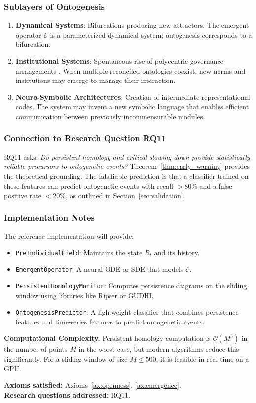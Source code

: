 \subsubsection{Sublayers of Ontogenesis}
\begin{enumerate}
    \item \textbf{Dynamical Systems}: Bifurcations producing new attractors. The emergent operator $\mathcal{E}$ is a parameterized dynamical system; ontogenesis corresponds to a bifurcation.
    \item \textbf{Institutional Systems}: Spontaneous rise of polycentric governance arrangements \cite{ostrom2010}. When multiple reconciled ontologies coexist, new norms and institutions may emerge to manage their interaction.
    \item \textbf{Neuro-Symbolic Architectures}: Creation of intermediate representational codes. The system may invent a new symbolic language that enables efficient communication between previously incommensurable modules.
\end{enumerate}

\subsubsection{Connection to Research Question RQ11}
RQ11 asks: \emph{Do persistent homology and critical slowing down provide statistically reliable precursors to ontogenetic events?} Theorem~\ref{thm:early_warning} provides the theoretical grounding. The falsifiable prediction is that a classifier trained on these features can predict ontogenetic events with recall $> 80\%$ and a false positive rate $< 20\%$, as outlined in Section~\ref{sec:validation}.

\subsubsection{Implementation Notes}
The reference implementation will provide:
\begin{itemize}
    \item \texttt{PreIndividualField}: Maintains the state $R_t$ and its history.
    \item \texttt{EmergentOperator}: A neural ODE or SDE that models $\mathcal{E}$.
    \item \texttt{PersistentHomologyMonitor}: Computes persistence diagrams on the sliding window using libraries like Ripser or GUDHI.
    \item \texttt{OntogenesisPredictor}: A lightweight classifier that combines persistence features and time-series features to predict ontogenetic events.
\end{itemize}

\textbf{Computational Complexity.} Persistent homology computation is $\mathcal{O}(M^3)$ in the number of points $M$ in the worst case, but modern algorithms reduce this significantly. For a sliding window of size $M \le 500$, it is feasible in real-time on a GPU.

\textbf{Axioms satisfied:} Axioms~\ref{ax:openness}, \ref{ax:emergence}. \\
\textbf{Research questions addressed:} RQ11.

\endinput